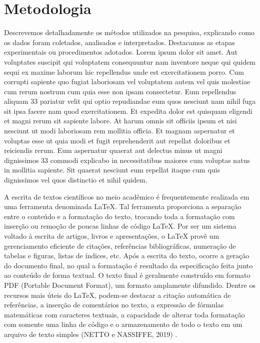 \documentclass[12pt]{article}
\begin{document}
\section{Metodologia} %
Descrevemos detalhadamente os métodos utilizados na pesquisa, explicando como os dados foram coletados, analisados e interpretados. Destacamos as etapas experimentais ou procedimentos adotados. Lorem ipsum dolor sit amet. Aut voluptates suscipit qui voluptatem consequuntur nam inventore neque qui quidem sequi ex maxime laborum hic repellendus unde est exercitationem porro. Cum corrupti sapiente quo fugiat laboriosam vel voluptatem autem vel quis molestiae cum rerum nostrum cum quia esse non ipsam consectetur. Eum repellendus aliquam 33 pariatur velit qui optio repudiandae eum quos nesciunt nam nihil fuga sit ipsa facere nam quod exercitationem. Et expedita dolor est quisquam eligendi et magni rerum sit sapiente labore. At harum omnis sit officiis ipsum et nisi nesciunt ut modi laboriosam rem mollitia officia. Et magnam aspernatur et voluptas esse ut quia modi et fugit reprehenderit aut repellat doloribus et reiciendis rerum. Eum aspernatur quaerat aut delectus minus ut magni dignissimos 33 commodi explicabo in necessitatibus maiores cum voluptas natus in mollitia sapiente. Sit quaerat nesciunt eum repellat itaque cum quis dignissimos vel quos distinctio et nihil quidem.
\\
\begin{adjustwidth}{4cm}{0cm} %
  \fontsize{10}{12}\selectfont %
  \justifying %
  A escrita de textos científicos no meio acadêmico é frequentemente realizada em uma ferramenta denominada LaTeX. Tal ferramenta proporciona a separação entre o conteúdo e a formatação do texto, trocando toda a formatação com inserção ou remoção de poucas linhas de código LaTeX. Por ser um sistema voltado à escrita de artigos, livros e apresentações, o LaTeX provê um gerenciamento eficiente de citações, referências bibliográficas, numeração de tabelas e figuras, listas de índices, etc. Após a escrita do texto, ocorre a geração do documento final, no qual a formatação é resultado da especificação feita junto ao conteúdo de forma textual. O texto final é geralmente construído em formato PDF (Portable Document Format), um formato amplamente difundido. Dentre os recursos mais úteis do LaTeX, podem-se destacar a citação automática de referências, a inserção de comentários no texto, a expressão de fórmulas matemáticas com caracteres textuais, a capacidade de alterar toda formatação com somente uma linha de código e o armazenamento de todo o texto em um arquivo de texto simples (NETTO e NASSIFFE, 2019) \cite{netto2018introduccao}.
  \\
\end{adjustwidth}
\end{document}
